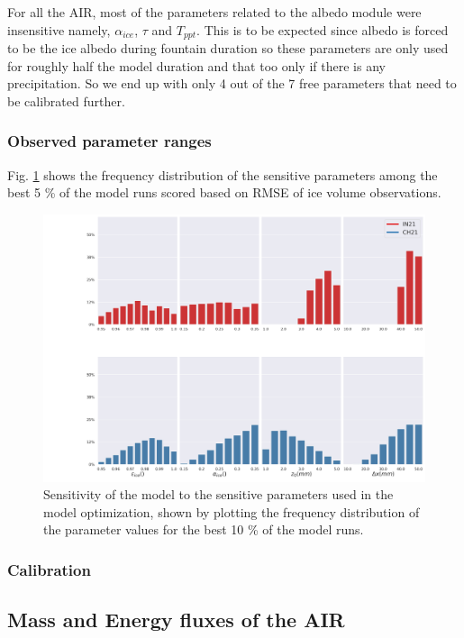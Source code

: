 \documentclass[utf8]{frontiersSCNS} %
\begin{document}
For all the AIR, most of the parameters related to the albedo module were insensitive namely, $\alpha_{ice}$, $\tau$ and
$T_{ppt}$. This is to be expected since albedo is forced to be the ice albedo during fountain duration so these
parameters are only used for roughly half the model duration and that too only if there is any precipitation. So we end
up with only 4 out of the 7 free parameters that need to be calibrated further.

\subsubsection{Observed parameter ranges}

Fig. \ref{fig:param_hist} shows the frequency distribution of the sensitive parameters among the best 5 \% of the model
runs scored based on RMSE of ice volume observations.

\begin{figure}
	\begin{center}
		\includegraphics[width=\linewidth]{Figures/param_hist.jpg}
	\end{center}
	\caption{Sensitivity of the model to the sensitive parameters used in the model optimization, shown by plotting the frequency
		distribution of the parameter values for the best 10 \% of the model runs. } \label{fig:param_hist} \end{figure}

\subsubsection{Calibration}

\subsection{Mass and Energy fluxes of the AIR}
\end{document}
